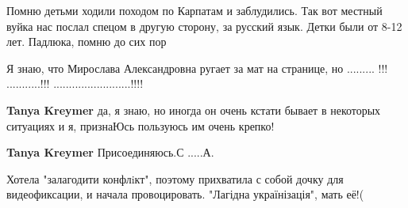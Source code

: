 \begin{itemize}
\begin{itemize}
 

Помню детьми ходили походом по Карпатам и заблудились. Так вот местный вуйка
нас послал спецом в другую сторону, за русский язык. Детки были от 8-12 лет.
Падлюка, помню до сих пор

\end{itemize}

 

Я знаю, что Мирослава Александровна ругает за мат на странице, но ......... !!!
...........!!! .........................!!!!

\begin{itemize}
 
\textbf{Tanya Kreymer} да, я знаю, но иногда он очень кстати бывает в некоторых ситуациях и я, признаЮсь пользуюсь им очень крепко!

 
\textbf{Tanya Kreymer} Присоединяюсь.С .....А.
\end{itemize}

 

Хотела "залагодити конфлiкт", поэтому прихватила с собой дочку для
видеофиксации, и начала провоцировать. "Лагідна українізація", мать её!(


 


\end{itemize}
